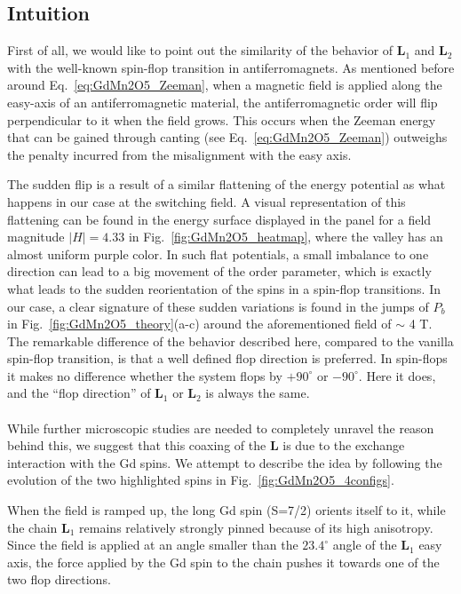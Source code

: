 \subsection{Intuition}
First of all, we would like to point out the similarity of the behavior of $\bm L_1$ and $\bm L_2$ with the well-known spin-flop transition in antiferromagnets.
As mentioned before around Eq.~\eqref{eq:GdMn2O5_Zeeman}, when a magnetic field is applied along the easy-axis of an antiferromagnetic material, the antiferromagnetic order will flip perpendicular to it when the field grows.
This occurs when the Zeeman energy that can be gained through canting (see Eq.~\eqref{eq:GdMn2O5_Zeeman}) outweighs the penalty incurred from the misalignment with the easy axis.

The sudden flip is a result of a similar flattening of the energy potential as what happens in our case at the switching field. A visual representation of this flattening can be found in the energy surface displayed in the panel for a field magnitude $|H| = 4.33$ in Fig.~\ref{fig:GdMn2O5_heatmap}, where the valley has an almost uniform purple color.
In such flat potentials, a small imbalance to one direction can lead to a big movement of the order parameter, which is exactly what leads to the sudden reorientation of the spins in a spin-flop transitions.
In our case, a clear signature of these sudden variations is found in the jumps of $P_b$ in Fig.~\ref{fig:GdMn2O5_theory}(a-c) around the aforementioned field of $\sim$ 4 T.
The remarkable difference of the behavior described here, compared to the vanilla spin-flop transition, is that a well defined flop direction is preferred. In spin-flops it makes no difference whether the system flops by $+90^\circ$ or $-90^\circ$. Here it does, and the ``flop direction'' of $\bm L_1$ or $\bm L_2$ is always the same.
\\\\
While further microscopic studies are needed to completely unravel the reason behind this, we suggest that this coaxing of the $\bm L$ is due to the exchange interaction with the Gd spins. We attempt to describe the idea by following the evolution of the two highlighted spins in Fig.~\ref{fig:GdMn2O5_4configs}.

When the field is ramped up, the long Gd spin (S=7/2) orients itself to it, while the chain $\bm L_1$ remains relatively strongly pinned because of its high anisotropy.
Since the field is applied at an angle smaller than the $23.4^\circ$ angle of the $\bm L_1$ easy axis, the force applied by the Gd spin to the chain pushes it towards one of the two flop directions.

